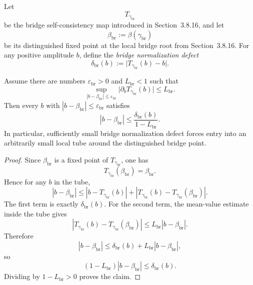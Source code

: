 \begin{definition}
\label{def:working-op1-bridge-defect}
Let
\[
 T_{\gamma_{\mathrm{br}}}
\]
be the bridge self-consistency map introduced in Section~3.8.16, and let
\[
 \beta_{\mathrm{br}}:=\beta(\gamma_{\mathrm{br}})
\]
be its distinguished fixed point at the local bridge root from Section~3.8.16. For any positive amplitude \(b\), define the \emph{bridge normalization defect}
\[
 \delta_{\mathrm{br}}(b):=
 \bigl|T_{\gamma_{\mathrm{br}}}(b)-b\bigr|.
\]
\end{definition}

\begin{proposition}
\label{prop:working-op1-residual-to-fixed-point}
Assume there are numbers \(\varepsilon_{\mathrm{br}}>0\) and \(L_{\mathrm{br}}<1\) such that
\[
 \sup_{|b-\beta_{\mathrm{br}}|\le \varepsilon_{\mathrm{br}}}
 \bigl|\partial_b T_{\gamma_{\mathrm{br}}}(b)\bigr|
 \le L_{\mathrm{br}}.
\]
Then every \(b\) with \(|b-\beta_{\mathrm{br}}|\le \varepsilon_{\mathrm{br}}\) satisfies
\[
 |b-\beta_{\mathrm{br}}|
 \le
 \frac{\delta_{\mathrm{br}}(b)}{1-L_{\mathrm{br}}}.
\]
In particular, sufficiently small bridge normalization defect forces entry into an arbitrarily small local tube around the distinguished bridge point.
\end{proposition}

\begin{proof}
Since \(\beta_{\mathrm{br}}\) is a fixed point of \(T_{\gamma_{\mathrm{br}}}\), one has
\[
 T_{\gamma_{\mathrm{br}}}(\beta_{\mathrm{br}})=\beta_{\mathrm{br}}.
\]
Hence for any \(b\) in the tube,
\[
 |b-\beta_{\mathrm{br}}|
 \le
 |b-T_{\gamma_{\mathrm{br}}}(b)|
 +
 |T_{\gamma_{\mathrm{br}}}(b)-T_{\gamma_{\mathrm{br}}}(\beta_{\mathrm{br}})|.
\]
The first term is exactly \(\delta_{\mathrm{br}}(b)\). For the second term, the mean-value estimate inside the tube gives
\[
 |T_{\gamma_{\mathrm{br}}}(b)-T_{\gamma_{\mathrm{br}}}(\beta_{\mathrm{br}})|
 \le
 L_{\mathrm{br}}|b-\beta_{\mathrm{br}}|.
\]
Therefore
\[
 |b-\beta_{\mathrm{br}}|
 \le
 \delta_{\mathrm{br}}(b)+L_{\mathrm{br}}|b-\beta_{\mathrm{br}}|,
\]
so
\[
 (1-L_{\mathrm{br}})|b-\beta_{\mathrm{br}}|
 \le
 \delta_{\mathrm{br}}(b).
\]
Dividing by \(1-L_{\mathrm{br}}>0\) proves the claim.
\end{proof}

